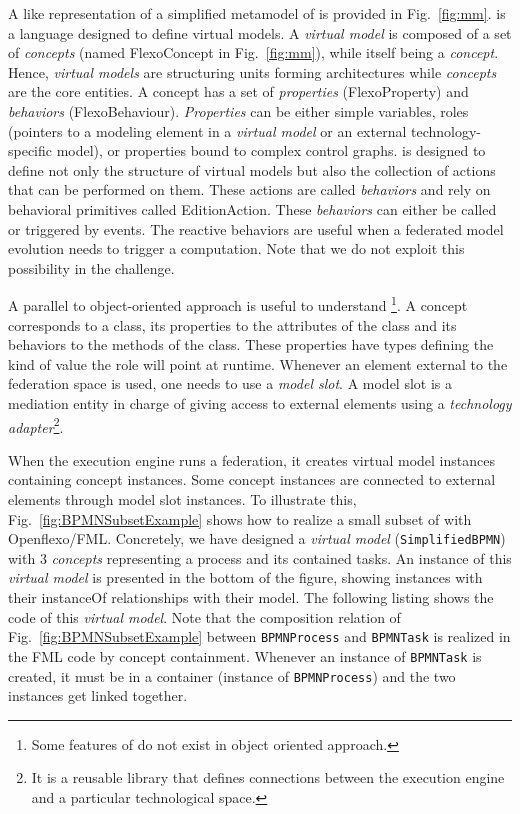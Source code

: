 A \UML like representation of a simplified metamodel of \FML is provided in
Fig.~\ref{fig:mm}. \FML is a language designed to define virtual models. A
\emph{virtual model} is composed of a set of \emph{concepts} (named
\textsf{FlexoConcept} in Fig.~\ref{fig:mm}), while itself being a
\emph{concept}. Hence, \emph{virtual models} are structuring units forming
architectures while \emph{concepts} are the core entities. A concept has a set
of \emph{properties} (\textsf{FlexoProperty}) and \emph{behaviors}
(\textsf{FlexoBehaviour}). \emph{Properties} can be either simple variables,
roles (pointers to a modeling element in a \emph{virtual model} or an external
technology-specific model), or properties bound to complex control graphs. \FML
is designed to define not only the structure of virtual models but also the
collection of actions that can be performed on them. These actions are called
\emph{behaviors} and rely on behavioral primitives called
\textsf{EditionAction}. These \emph{behaviors} can either be called or
triggered by events. The reactive behaviors are useful when a federated model
evolution needs to trigger a computation. Note that we do not exploit this
possibility in the challenge.

A parallel to object-oriented approach is useful to understand
\FML\footnote{Some features of \FML do not exist in object oriented approach.}.
A concept corresponds to a class, its properties to the attributes of the class
and its behaviors to the methods of the class. These properties have types
defining the kind of value the role will point at runtime. Whenever an element
external to the federation space is used, one needs to use a \emph{model slot}.
A model slot is a mediation entity in charge of giving access to external
elements using a \emph{technology adapter}\footnote{It is a reusable library
that defines connections between the \FML execution engine and a particular
technological space.}.

When the \FML execution engine runs a federation, it creates virtual
model instances containing concept instances. Some concept instances
are connected to external elements through model slot instances.
%
To illustrate this, Fig.~\ref{fig:BPMNSubsetExample} shows how to realize a
small subset of \BPMN with Openflexo/FML. Concretely, we have designed a
\textit{virtual model} (\texttt{SimplifiedBPMN}) with 3 \textit{concepts}
representing a process and its contained tasks. An instance of this
\textit{virtual model} is presented in the bottom of the figure, showing
instances with their \textsf{instanceOf} relationships with their model.
%
The following listing shows the \FML code of this \textit{virtual model}. Note
that the composition relation of Fig.~\ref{fig:BPMNSubsetExample} between
\texttt{BPMNProcess} and \texttt{BPMNTask} is realized in the FML code by
concept containment. Whenever an instance of \texttt{BPMNTask} is created, it
must be in a container (instance of \texttt{BPMNProcess}) and the two instances
get linked together. %

